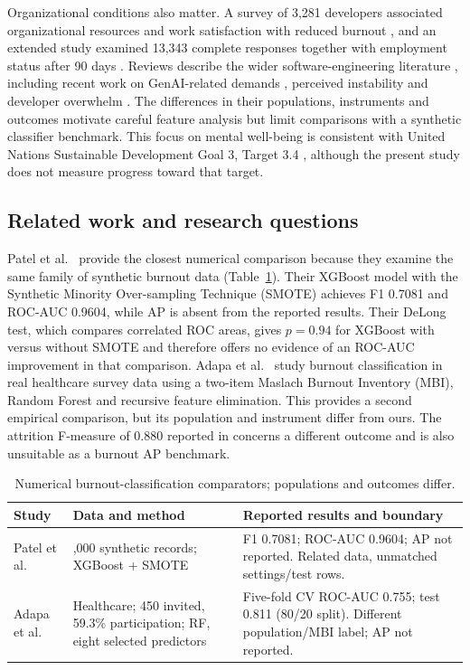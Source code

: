 \documentclass[runningheads]{llncs}
\begin{document}
Organizational conditions also matter. A survey of 3,281 developers associated organizational resources and work satisfaction with reduced burnout \cite{trink23}, and an extended study examined 13,343 complete responses together with employment status after 90 days \cite{trink24}. Reviews describe the wider software-engineering literature \cite{mapping,review}, including recent work on GenAI-related demands \cite{feng}, perceived instability \cite{ribeiro} and developer overwhelm \cite{michels}. The differences in their populations, instruments and outcomes motivate careful feature analysis but limit comparisons with a synthetic classifier benchmark. This focus on mental well-being is consistent with United Nations Sustainable Development Goal 3, Target 3.4 \cite{un}, although the present study does not measure progress toward that target.

\subsection{Related work and research questions}
Patel et al.\ \cite{patel} provide the closest numerical comparison because they examine the same family of synthetic burnout data (Table~\ref{tab:related}). Their XGBoost model with the Synthetic Minority Over-sampling Technique (SMOTE) achieves F1 0.7081 and ROC-AUC 0.9604, while AP is absent from the reported results. Their DeLong test, which compares correlated ROC areas, gives $p=0.94$ for XGBoost with versus without SMOTE and therefore offers no evidence of an ROC-AUC improvement in that comparison. Adapa et al.\ \cite{adapa} study burnout classification in real healthcare survey data using a two-item Maslach Burnout Inventory (MBI), Random Forest and recursive feature elimination. This provides a second empirical comparison, but its population and instrument differ from ours. The attrition F-measure of 0.880 reported in \cite{trink24} concerns a different outcome and is also unsuitable as a burnout AP benchmark.

\begin{table}[!htbp]\caption{Numerical burnout-classification comparators; populations and outcomes differ.}\label{tab:related}\centering\small\begin{tabular}{>{\raggedright\arraybackslash}p{}>{\raggedright\arraybackslash}p{}>{\raggedright\arraybackslash}p{}}\toprule Study & Data and method & Reported results and boundary \\ \midrule
Patel et al.\ \cite{patel} & 150,000 synthetic records; XGBoost + SMOTE & F1 0.7081; ROC-AUC 0.9604; AP not reported. Related data, unmatched settings/test rows. \\
Adapa et al.\ \cite{adapa} & Healthcare; 450 invited, 59.3\% participation; RF, eight selected predictors & Five-fold CV ROC-AUC 0.755; test 0.811 (80/20 split). Different population/MBI label; AP not reported. \\
\bottomrule\end{tabular}\end{table}
\end{document}
